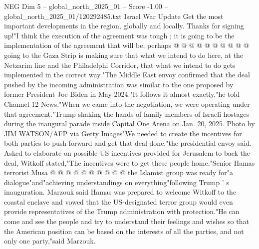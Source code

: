 \begin{textsample}{NEG Dim 5 – global\_north\_2025\_01 – Score -1.00 – global\_north\_2025\_01/120292485.txt}
Israel War Update Get the most important developments in the region, globally and locally.
Thanks for signing up!"I think the execution of the agreement was tough ; it is going to be the implementation of the agreement that will be, perhaps @ @ @ @ @ @ @ @ @ @ going to the Gaza Strip is making sure that what we intend to do here, at the Netzarim line and the Philadelphi Corridor, that what we intend to do gets implemented in the correct way."The Middle East envoy confirmed that the deal pushed by the incoming administration was similar to the one proposed by former President Joe Biden in May 2024."It follows it almost exactly,"he told Channel 12 News."When we came into the negotiation, we were operating under that agreement."Trump shaking the hands of family members of Israeli hostages during the inaugural parade inside Capital One Arena on Jan. 20, 2025.
Photo by JIM WATSON/AFP via Getty Images"We needed to create the incentives for both parties to push forward and get that deal done,"the presidential envoy said.
Asked to elaborate on possible US incentives provided for Jerusalem to back the deal, Witkoff stated,"The incentives were to get these people home."Senior Hamas terrorist Musa @ @ @ @ @ @ @ @ @ @ the Islamist group was ready for"a dialogue"and"achieving understandings on everything"following Trump ' s inauguration.
Marzouk said Hamas was prepared to welcome Witkoff to the coastal enclave and vowed that the US-designated terror group would even provide representatives of the Trump administration with protection."He can come and see the people and try to understand their feelings and wishes so that the American position can be based on the interests of all the parties, and not only one party,"said Marzouk.

\end{textsample}
